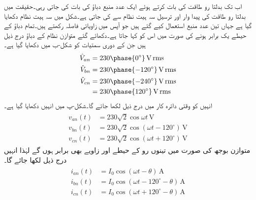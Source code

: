 اب تک بدلتا رو طاقت کی بات کرتے ہوئے  ایک عدد منبع دباؤ کی بات کی جاتی رہی۔حقیقت میں بدلتا رو طاقت کی پیدا وار اور ترسیل سہ ہیت نظام سے کی جاتی ہے۔شکل  میں سہ ہیت نظام دکھایا گیا ہے جہاں تین عدد منبع استعمال کیے گئے ہیں جو آپس میں  زاویائی فاصلہ رکھتے ہیں۔تمام دباؤ کے حیطے یک برابر ہونے کی صورت میں اس کو  کہا جاتا ہے۔دکھائے گئے متوازن نظام کے دباؤ درج ذیل ہیں جن کے دوری سمتیات کو شکل-ب میں دکھایا گیا ہے۔
\begin{gather}
\begin{aligned}
\hat{V}_{an}&=230 \phase{0^{\circ}}\,\si{\volt}\, \rms\\
\hat{V}_{bn}&=230 \phase{-120^{\circ}}\,\si{\volt}\, \rms\\
\hat{V}_{cn}&=230 \phase{-240^{\circ}}\,\si{\volt}\, \rms\\
&=230 \phase{120^{\circ}}\,\si{\volt}\, \rms
\end{aligned}
\end{gather}
انہیں کو وقتی دائرہ کار میں درج ذیل لکھا جائے گا۔شکل-پ میں انہیں دکھایا گیا ہے۔
\begin{gather}
\begin{aligned}\label{مساوات_تین_دوری_ستارہ_الف}
v_{an}(t)&=230\sqrt{2} \cos\omega t \,\si{\volt}\\
v_{bn}(t)&=230\sqrt{2} \cos(\omega t-120^{\circ})\,\si{\volt}\\
v_{cn}(t)&=230\sqrt{2} \cos(\omega t +120^{\circ})\,\si{\volt}
\end{aligned}
\end{gather}
متوازن بوجھ کی صورت میں تینوں رو کے حیطے اور زاویے بھی برابر ہوں گے لہٰذا انہیں درج ذیل لکھا جائے گا۔
\begin{gather}
\begin{aligned}
i_{an}(t)&=I_0 \cos(\omega t -\theta)\,\si{\ampere}\\
i_{bn}(t)&=I_0 \cos(\omega t-120^{\circ}-\theta)\,\si{\ampere}\\
i_{cn}(t)&=I_0 \cos(\omega t +120^{\circ}-\theta)\,\si{\ampere}
\end{aligned}
\end{gather}
%
